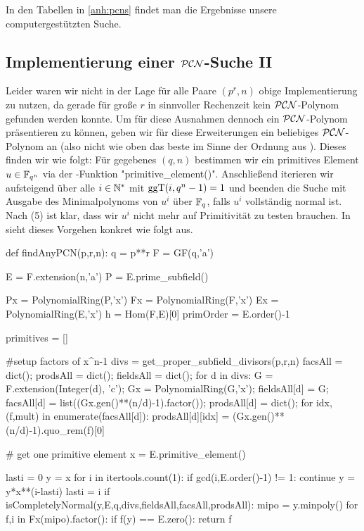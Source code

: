 In den Tabellen in \autoref{anh:pcns} findet man die Ergebnisse unsere
computergestützten Suche.


\subsection{Implementierung einer $\mathcal{PCN}$-Suche II}

Leider waren wir nicht in der Lage für alle Paare $(p^r,n)$ obige Implementierung
zu nutzen, da gerade für große $r$ in sinnvoller Rechenzeit kein $\mathcal{PCN}$-Polynom
gefunden werden konnte. Um für diese Ausnahmen dennoch ein $\mathcal{PCN}$-Polynom
präsentieren zu können, geben wir für diese Erweiterungen ein beliebiges
$\mathcal{PCN}$-Polynom an (also nicht wie oben das beste im Sinne der Ordnung aus
). Dieses finden wir wie folgt: Für gegebenes $(q,n)$
bestimmen wir ein primitives Element $u \in \mathbb{F}_{q^n}$ via der \sage-Funktion
"primitive_element()". Anschließend iterieren wir aufsteigend über alle 
$i\in\mathbb{N}^\ast$ mit $\operatorname{ggT}(i,q^n-1) = 1$ und beenden die Suche mit
Ausgabe des Minimalpolynoms von $u^i$ über $\mathbb{F}_q$, falls
$u^i$ vollständig normal ist. Nach  (5) ist klar, dass
wir $u^i$ nicht mehr auf Primitivität zu testen brauchen.
In \sage sieht dieses Vorgehen konkret wie folgt aus.

\begin{sagecode}[caption={Aus \url{../Sage/findAnyPCN_additional.spyx}}]
def findAnyPCN(p,r,n):
    q = p**r
    F = GF(q,'a')

    E = F.extension(n,'a')
    P = E.prime_subfield()

    Px = PolynomialRing(P,'x')
    Fx = PolynomialRing(F,'x')
    Ex = PolynomialRing(E,'x')
    h = Hom(F,E)[0]
    primOrder = E.order()-1
    
    primitives = []
    
    #setup factors of x^n-1
    divs = get_proper_subfield_divisors(p,r,n)
    facsAll = dict();
    prodsAll = dict();
    fieldsAll = dict();
    for d in divs:
        G = F.extension(Integer(d), 'c');
        Gx = PolynomialRing(G,'x');
        fieldsAll[d] = G;
        facsAll[d] = list((Gx.gen()**(n/d)-1).factor());
        prodsAll[d] = dict();
        for idx,(f,mult) in enumerate(facsAll[d]):
            prodsAll[d][idx] = (Gx.gen()**(n/d)-1).quo_rem(f)[0]
    
    # get one primitive element
    x = E.primitive_element()
    
    lasti = 0
    y = x
    for i in itertools.count(1):
        if gcd(i,E.order()-1) != 1: continue
        y = y*x**(i-lasti)
        lasti = i
        if isCompletelyNormal(y,E,q,divs,fieldsAll,facsAll,prodsAll):
            mipo = y.minpoly()
            for f,i in Fx(mipo).factor():
                if f(y) == E.zero():
                    return f
\end{sagecode}


